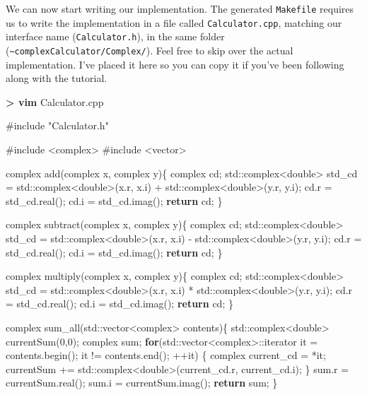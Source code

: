 \documentclass[]{article}
\newenvironment{Shaded}{}{}
\newcommand{\KeywordTok}[1]{\textcolor[rgb]{0.00,0.44,0.13}{\textbf{{#1}}}}
\newcommand{\DataTypeTok}[1]{\textcolor[rgb]{0.56,0.13,0.00}{{#1}}}
\newcommand{\DecValTok}[1]{\textcolor[rgb]{0.25,0.63,0.44}{{#1}}}
\newcommand{\OtherTok}[1]{\textcolor[rgb]{0.00,0.44,0.13}{{#1}}}
\newcommand{\NormalTok}[1]{{#1}}
\begin{document}
We can now start writing our implementation. The generated
\texttt{Makefile} requires us to write the implementation in a file
called \texttt{Calculator.cpp}, matching our interface name
(\texttt{Calculator.h}), in the same folder
(\texttt{\textasciitilde{}complexCalculator/Complex/}). Feel free to
skip over the actual implementation. I've placed it here so you can copy
it if you've been following along with the tutorial.

\begin{Shaded}
\begin{Highlighting}[]
\KeywordTok{> vim} \NormalTok{Calculator.cpp}
\end{Highlighting}
\end{Shaded}

\begin{Shaded}
\begin{Highlighting}[]
\OtherTok{#include "Calculator.h"}

\OtherTok{#include <complex>}
\OtherTok{#include <vector>}

\NormalTok{complex add(complex x, complex y)\{}
    \NormalTok{complex cd;}
    \NormalTok{std::complex<}\DataTypeTok{double}\NormalTok{> std_cd = std::complex<}\DataTypeTok{double}\NormalTok{>(x.r, x.i) + std::complex<}\DataTypeTok{double}\NormalTok{>(y.r, y.i);}
    \NormalTok{cd.r = std_cd.real();}
    \NormalTok{cd.i = std_cd.imag();}
    \KeywordTok{return} \NormalTok{cd;}
\NormalTok{\}}

\NormalTok{complex subtract(complex x, complex y)\{}
    \NormalTok{complex cd;}
    \NormalTok{std::complex<}\DataTypeTok{double}\NormalTok{> std_cd = std::complex<}\DataTypeTok{double}\NormalTok{>(x.r, x.i) - std::complex<}\DataTypeTok{double}\NormalTok{>(y.r, y.i);}
    \NormalTok{cd.r = std_cd.real();}
    \NormalTok{cd.i = std_cd.imag();}
    \KeywordTok{return} \NormalTok{cd;}
\NormalTok{\}}

\NormalTok{complex multiply(complex x, complex y)\{}
    \NormalTok{complex cd;}
    \NormalTok{std::complex<}\DataTypeTok{double}\NormalTok{> std_cd = std::complex<}\DataTypeTok{double}\NormalTok{>(x.r, x.i) * std::complex<}\DataTypeTok{double}\NormalTok{>(y.r, y.i);}
    \NormalTok{cd.r = std_cd.real();}
    \NormalTok{cd.i = std_cd.imag();}
    \KeywordTok{return} \NormalTok{cd;}
\NormalTok{\}}

\NormalTok{complex sum_all(std::vector<complex> contents)\{}
    \NormalTok{std::complex<}\DataTypeTok{double}\NormalTok{> currentSum(}\DecValTok{0}\NormalTok{,}\DecValTok{0}\NormalTok{);}
    \NormalTok{complex sum;}
    \KeywordTok{for}\NormalTok{(std::vector<complex>::iterator it = contents.begin(); it != contents.end(); ++it) \{}
        \NormalTok{complex current_cd = *it;}
        \NormalTok{currentSum += std::complex<}\DataTypeTok{double}\NormalTok{>(current_cd.r, current_cd.i);}
    \NormalTok{\}}
    \NormalTok{sum.r = currentSum.real();}
    \NormalTok{sum.i = currentSum.imag();}
    \KeywordTok{return} \NormalTok{sum;}
\NormalTok{\}}



\end{Highlighting}
\end{Shaded}
\end{document}
